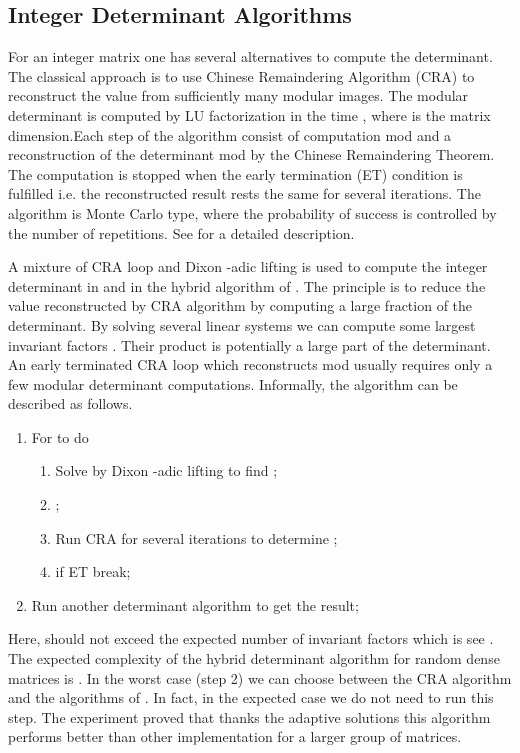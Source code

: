 \documentclass{acm_proc_article-sp}   \usepackage{graphicx,url}
\begin{document}
\subsection{Integer Determinant Algorithms}\label{sec:ida}

For an integer matrix  one has several alternatives to compute the
determinant.
The classical approach is to use Chinese Remaindering Algorithm (CRA)
to reconstruct the value from sufficiently many modular images.
The modular determinant is computed  by LU factorization in the time
, where  is the matrix dimension.Each step of the algorithm consist of computation mod  and a
reconstruction of the determinant mod  by the Chinese
Remaindering Theorem. The computation is stopped when the early
termination (ET) condition is fulfilled i.e. the reconstructed
result rests the same for several iterations. The algorithm is Monte
Carlo type, where the probability of success is controlled by the
number of repetitions. See \cite{Dumas2001, jgd:2006:det} for a
detailed description.



A mixture of CRA loop and Dixon -adic lifting is used to compute the integer determinant in  \cite{Abbott1999} and in the hybrid algorithm of \cite{jgd:2006:det}. The principle is to reduce the value reconstructed by CRA algorithm by computing a large fraction of the determinant. By solving several linear systems we can compute some largest invariant factors . Their product  is potentially a large part of the determinant. An early terminated CRA loop which reconstructs  mod  usually requires only a few modular determinant computations. Informally, the algorithm can be described as follows.
\begin{enumerate}
\item For  to  do
\begin{enumerate}
\item Solve  by Dixon -adic lifting to find ;
\item ;
\item Run CRA for several iterations to determine ;
\item if ET break;
\end{enumerate}
\item Run another determinant algorithm to get the result;
\end{enumerate}
Here,  should not exceed the expected number of invariant factors which is  see \cite{jgd:2006:det}.
The expected complexity of the hybrid determinant algorithm
\cite{jgd:2006:det} for random dense matrices is . In the worst case (step 2) we can
choose between the CRA algorithm and the algorithms of
\cite{Storjohann2004, Eberly2000, Kaltofen2005}. In fact, in the
expected case we do not need to run this step.
The experiment proved that thanks the adaptive solutions this algorithm performs better than other implementation for a larger group of matrices.
\end{document}
